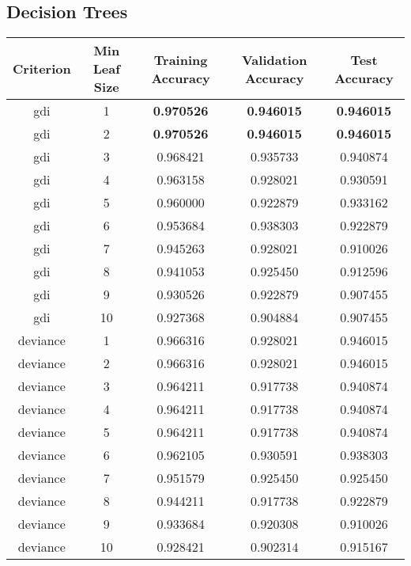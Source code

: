 \documentclass[12pt]{article}
\begin{document}
\subsection{Decision Trees}
\begin{center}
    \begin{tabular}{| c | c | c | c | c |} 
    \hline
    Criterion & Min Leaf Size & Training Accuracy & Validation Accuracy & Test Accuracy \\ 
	\hline \hline
	gdi & 1 & \textbf{0.970526} & \textbf{0.946015} & \textbf{0.946015} \\
	\hline
	gdi & 2 & \textbf{0.970526} & \textbf{0.946015} & \textbf{0.946015} \\
	\hline
	gdi & 3 & 0.968421 & 0.935733 & 0.940874 \\
	\hline
	gdi & 4 & 0.963158 & 0.928021 & 0.930591 \\
	\hline
	gdi & 5 & 0.960000 & 0.922879 & 0.933162 \\
	\hline
	gdi & 6 & 0.953684 & 0.938303 & 0.922879 \\
	\hline
	gdi & 7 & 0.945263 & 0.928021 & 0.910026 \\
	\hline
	gdi & 8 & 0.941053 & 0.925450 & 0.912596 \\
	\hline
	gdi & 9 & 0.930526 & 0.922879 & 0.907455 \\
	\hline
	gdi & 10 & 0.927368 & 0.904884 & 0.907455 \\
	\hline \hline
	deviance & 1 & 0.966316 & 0.928021 & 0.946015 \\
	\hline
	deviance & 2 & 0.966316 & 0.928021 & 0.946015 \\
	\hline
	deviance & 3 & 0.964211 & 0.917738 & 0.940874 \\
	\hline
	deviance & 4 & 0.964211 & 0.917738 & 0.940874 \\
	\hline
	deviance & 5 & 0.964211 & 0.917738 & 0.940874 \\
	\hline
	deviance & 6 & 0.962105 & 0.930591 & 0.938303 \\
	\hline
	deviance & 7 & 0.951579 & 0.925450 & 0.925450 \\
	\hline
	deviance & 8 & 0.944211 & 0.917738 & 0.922879 \\
	\hline
	deviance & 9 & 0.933684 & 0.920308 & 0.910026 \\
	\hline
	deviance & 10 & 0.928421 & 0.902314 & 0.915167 \\
	\hline
    \end{tabular}
\end{center}
\end{document}
